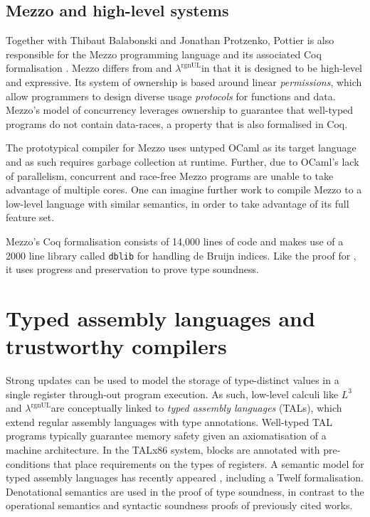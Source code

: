 \documentclass[]{unswthesis}
\newcommand{\rgnUL}{$\lambda^\text{rgnUL}$\text{ }}
\newcommand{\SSPHS}{\text{SSPHS }}
\begin{document}
\subsection{Mezzo and high-level systems}

Together with Thibaut Balabonski and Jonathan Protzenko, Pottier is also responsible for the Mezzo programming language and its associated Coq formalisation \cite{mezzo14}. Mezzo differs from \SSPHS and \rgnUL in that it is designed to be high-level and expressive. Its system of ownership is based around linear \textit{permissions}, which allow programmers to design diverse usage \textit{protocols} for functions and data. Mezzo's model of concurrency leverages ownership to guarantee that well-typed programs do not contain data-races, a property that is also formalised in Coq.

The prototypical compiler for Mezzo uses untyped OCaml as its target language and as such requires garbage collection at runtime. Further, due to OCaml's lack of parallelism, concurrent and race-free Mezzo programs are unable to take advantage of multiple cores. One can imagine further work to compile Mezzo to a low-level language with similar semantics, in order to take advantage of its full feature set.

Mezzo's Coq formalisation consists of 14,000 lines of code and makes use of a 2000 line library called \texttt{dblib} for handling de Bruijn indices. Like the proof for \SSPHS, it uses progress and preservation to prove type soundness.




\section{Typed assembly languages and trustworthy compilers}

Strong updates can be used to model the storage of type-distinct values in a single register through-out program execution. As such, low-level calculi like $L^3$ and \rgnUL are conceptually linked to \textit{typed assembly languages} (TALs), which extend regular assembly languages with type annotations. Well-typed TAL programs typically guarantee memory safety given an axiomatisation of a machine architecture. In the TALx86 \cite{morrisett99, crary99} system, blocks are annotated with pre-conditions that place requirements on the types of registers. A semantic model for typed assembly languages has recently appeared \cite{ahmed10}, including a Twelf formalisation. Denotational semantics are used in the proof of type soundness, in contrast to the operational semantics and syntactic soundness proofs of previously cited works.
\end{document}
